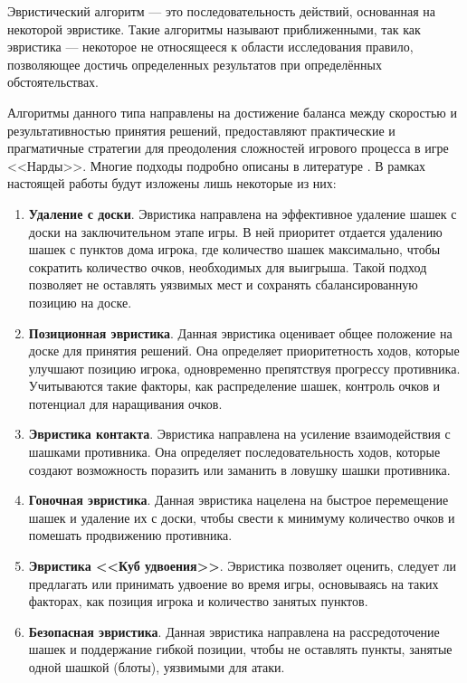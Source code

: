 Эвристический алгоритм --- это последовательность действий, основанная на некоторой эвристике. Такие алгоритмы называют приближенными, так как эвристика --- некоторое не относящееся к области исследования правило, позволяющее достичь определенных результатов при определённых обстоятельствах.

Алгоритмы данного типа направлены на достижение баланса между скоростью и результативностью принятия решений, предоставляют практические и прагматичные стратегии для преодоления сложностей игрового процесса в игре <<Нарды>>. Многие подходы подробно описаны в литературе \cite{backgammon-strategies}. В рамках настоящей работы будут изложены лишь некоторые из них:

\begin{enumerate}
    \item \textbf{Удаление с доски}. Эвристика направлена на эффективное удаление шашек с доски на заключительном этапе игры. В ней приоритет отдается удалению шашек с пунктов дома игрока, где количество шашек максимально, чтобы сократить количество очков, необходимых для выигрыша. Такой подход позволяет не оставлять уязвимых мест и сохранять сбалансированную позицию на доске.
    \item \textbf{Позиционная эвристика}. Данная эвристика оценивает общее положение на доске для принятия решений. Она определяет приоритетность ходов, которые улучшают позицию игрока, одновременно препятствуя прогрессу противника. Учитываются такие факторы, как распределение шашек, контроль очков и потенциал для наращивания очков.
    \item \textbf{Эвристика контакта}. Эвристика направлена на усиление взаимодействия с шашками противника. Она определяет последовательность ходов, которые создают возможность поразить или заманить в ловушку шашки противника.
    \item \textbf{Гоночная эвристика}. Данная эвристика нацелена на быстрое перемещение шашек и удаление их с доски, чтобы свести к минимуму количество очков и помешать продвижению противника.
    \item \textbf{Эвристика <<Куб удвоения>>}. Эвристика позволяет оценить, следует ли предлагать или принимать удвоение во время игры, основываясь на таких факторах, как позиция игрока и количество занятых пунктов.
    \item \textbf{Безопасная эвристика}. Данная эвристика направлена на рассредоточение шашек и поддержание гибкой позиции, чтобы не оставлять пункты, занятые одной шашкой (блоты), уязвимыми для атаки.
\end{enumerate}
